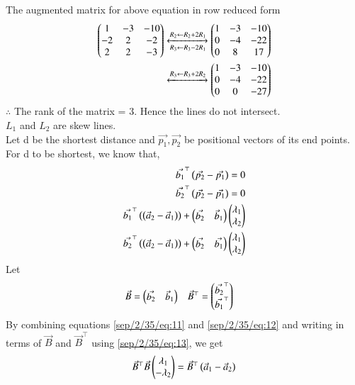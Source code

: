 The augmented matrix for above equation in row reduced form
\begin{align}
    \begin{pmatrix}1 & -3  & -10\\ -2 &2 & -2\\ 2 & 2 & -3\end{pmatrix} \xleftrightarrow[R_{3}\leftarrow R_{3}-2R_{1}]{R_{2}\leftarrow{R_2 +2R_1}} \begin{pmatrix}1 & -3  & -10\\ 0 &-4 & -22\\ 0 & 8 & 17\end{pmatrix}\\ \xleftrightarrow{R_3 \leftarrow{R_3+2R_2}} \begin{pmatrix}1 & -3  & -10\\ 0 &-4 & -22\\ 0 & 0 & -27\end{pmatrix}
\end{align}
$\therefore$ The rank of the matrix = 3. Hence the lines do not intersect. \\                                                                                                                           $L_{1}$ and $L_{2}$ are skew lines. \\
Let d be the shortest distance and $\Vec{p_{1}}, \Vec{p_{2}}$ be positional vectors of its end points.
For d to be shortest, we know that,
\begin{align}
    \label{sep/2/35/eq:9}
    \Vec{b_{1}}^\top\left(\Vec{p_{2}}-\Vec{p_{1}}\right)=0\\
    \label{sep/2/35/eq:10}
     \Vec{b_{2}}^\top\left(\Vec{p_{2}}-\Vec{p_{1}}\right)=0\\
     \label{sep/2/35/eq:11}
     \Vec{b_{1}}^\top\left(\left(\Vec{a}_{2} - \Vec{a}_{1}\right)\right)+\begin{pmatrix}\Vec{b_{2}} & \Vec{b}_{1}\end{pmatrix}\begin{pmatrix}\lambda_{1} \\ \lambda_{2}\end{pmatrix}\\
     \label{sep/2/35/eq:12}
     \Vec{b_{2}}^\top\left(\left(\Vec{a}_{2} - \Vec{a}_{1}\right)\right)+\begin{pmatrix}\Vec{b_{2}} & \Vec{b_{1}}\end{pmatrix}\begin{pmatrix}\lambda_{1} \\ \lambda_{2}\end{pmatrix}
\end{align}
Let 
\begin{align}
\label{sep/2/35/eq:13}
    \Vec{B}&=\begin{pmatrix}\Vec{b_{2}} & \Vec{b}_{1}\end{pmatrix} & \Vec{B}^\top&=\begin{pmatrix}\Vec{b_{2}}^\top \\ \Vec{b_{1}}^\top\end{pmatrix}
\end{align}
By combining equations \eqref{sep/2/35/eq:11} and \eqref{sep/2/35/eq:12} and writing in terms of $\Vec{B}$ and $\Vec{B}^\top$ using \eqref{sep/2/35/eq:13}, we get
\begin{align}
    \label{sep/2/35/eq:14}
    \Vec{B}^\top\Vec{B}\begin{pmatrix}\lambda_{1} \\ -\lambda_{2}\end{pmatrix}= \Vec{B}^\top\left(\Vec{a}_{1} - \Vec{a}_{2}\right)
\end{align}
